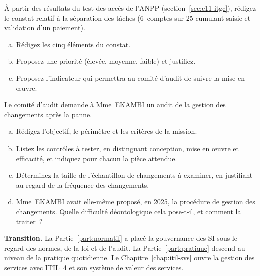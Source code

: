 \begin{boxexo}[title={\ding{45}\quad Exercice~11.2. Rédiger un constat \niveaumoyen}]
À partir des résultats du test des accès de l'ANPP (section~\ref{sec:c11-itgc}),
rédigez le constat relatif à la séparation des tâches (6~comptes sur
25 cumulant saisie et validation d'un paiement).
\begin{enumerate}[(a)]
    \item Rédigez les cinq éléments du constat.
    \item Proposez une priorité (élevée, moyenne, faible) et justifiez.
    \item Proposez l'indicateur qui permettra au comité d'audit de suivre la
          mise en œuvre.
\end{enumerate}
\end{boxexo}

\begin{boxexo}[title={\ding{45}\quad Exercice~11.3. Planifier l'audit des changements de la BANQUE SANAGA \niveauexpert}]
Le comité d'audit demande à Mme~EKAMBI un audit de la gestion des
changements après la panne.
\begin{enumerate}[(a)]
    \item Rédigez l'objectif, le périmètre et les critères de la mission.
    \item Listez les contrôles à tester, en distinguant conception, mise en
          œuvre et efficacité, et indiquez pour chacun la pièce attendue.
    \item Déterminez la taille de l'échantillon de changements à examiner,
          en justifiant au regard de la fréquence des changements.
    \item Mme~EKAMBI avait elle-même proposé, en 2025, la procédure de
          gestion des changements. Quelle difficulté déontologique cela
          pose-t-il, et comment la traiter~?
\end{enumerate}
\end{boxexo}

\bigskip

\begin{boxinfo}
\textbf{Transition.} La Partie~\ref{part:normatif} a placé la gouvernance
des SI sous le regard des normes, de la loi et de l'audit. La
Partie~\ref{part:pratique} descend au niveau de la pratique quotidienne.
Le Chapitre~\ref{chap:itil-svs} ouvre la gestion des services avec ITIL~4
et son système de valeur des services.
\end{boxinfo}
